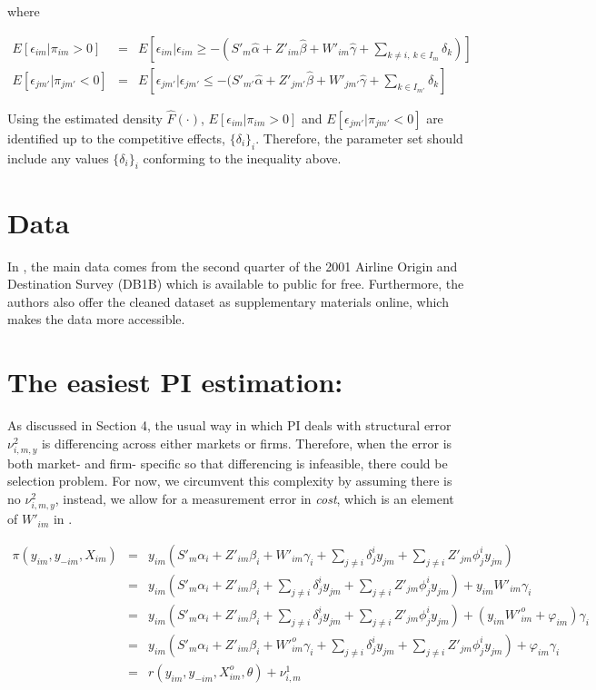 \documentclass[a4paper]{article}
\begin{document}
where

$$
\begin{array}{rcl}
E[\epsilon_{im} | \pi_{im} > 0 ] & = & \displaystyle E[\epsilon_{im} | \epsilon_{im} \geq -  (S'_m\hat{\alpha}+Z'_{im}\hat{\beta}+W'_{im}\hat{\gamma}+\sum_{k\neq i,\ k \in I_m}\delta_{k})] \\
E[\epsilon_{jm'} | \pi_{jm'} < 0 ] & = & \displaystyle E[\epsilon_{jm'} | \epsilon_{jm'} \leq -  (S'_{m'}\hat{\alpha}+Z'_{jm'}\hat{\beta}+W'_{jm'}\hat{\gamma} + \sum_{k \in I_{m'}}\delta_{k}]
\end{array}
$$

Using the estimated density $\hat{F}(\cdot)$, $E[\epsilon_{im} | \pi_{im} > 0 ]$ and $E[\epsilon_{jm'} | \pi_{jm'} < 0 ]$ are identified up to the competitive effects, $\{\delta_i \}_i$. Therefore, the parameter set should include any values $\{\delta_i \}_i$ conforming to the inequality above. 


\section{Data}

In \cite{ciliberto2009market}, the main data comes from the second quarter of the 2001 Airline Origin and Destination Survey (DB1B) which is available to public for free. Furthermore, the authors also offer the cleaned dataset as supplementary materials online, which makes the data more accessible. 


\section{The easiest PI estimation:}

As discussed in Section 4, the usual way in which PI deals with structural error $\nu_{i,m,y}^2$ is differencing across either markets or firms. Therefore, when the error is both market- and firm- specific so that differencing is infeasible, there could be selection problem. For now, we circumvent this complexity by assuming there is no $\nu_{i,m,y}^2$, instead, we allow for a measurement error in \textit{cost}, which is an element of $W'_{im}$ in \cite{ciliberto2009market}.

\begin{eqnarray}
\pi(y_{im},y_{-im},X_{im}) &=& y_{im}(S'_m\alpha_i+Z'_{im}\beta_i+W'_{im} \gamma_i+\sum_{j\neq i}\delta_{j}^i y_{jm}+\sum_{j\neq i}Z'_{jm}\phi_j^iy_{jm})  \nonumber \\
&=& y_{im}(S'_m\alpha_i+Z'_{im}\beta_i +\sum_{j\neq i}\delta_{j}^i y_{jm}+\sum_{j\neq i}Z'_{jm}\phi_j^iy_{jm}) + y_{im} W'_{im} \gamma_i \nonumber \\
&=& y_{im}(S'_m\alpha_i+Z'_{im}\beta_i +\sum_{j\neq i}\delta_{j}^i y_{jm}+\sum_{j\neq i}Z'_{jm}\phi_j^iy_{jm}) + (y_{im} W'^o_{im}  + \varphi_{im})\gamma_i\nonumber \\
&=& y_{im}(S'_m\alpha_i+Z'_{im}\beta_i+ W'^o_{im}\gamma_i+\sum_{j\neq i}\delta_{j}^i y_{jm}+\sum_{j\neq i}Z'_{jm}\phi_j^iy_{jm}) + \varphi_{im}\gamma_{i}\nonumber \\
&=& r(y_{im},y_{-im},X^o_{im}, \theta) + \nu^1_{i,m} 
\label{profit_PI}
\end{eqnarray}
\end{document}
